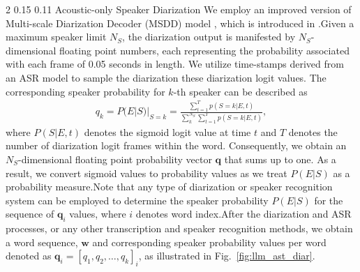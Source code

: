 \documentclass{article}
\makeatletter
\renewcommand{\subsection}{\@startsection
  {subsection}%
  {2}%
  {}%
  {0.15\baselineskip}%
  {0.11\baselineskip}%
  {}}%
\makeatother
\begin{document}
\subsection{Acoustic-only Speaker Diarization}
\label{sec:acoustic_infer}
We employ an improved version of Multi-scale Diarization Decoder (MSDD) model \cite{park2022multi}, which is introduced in \cite{park2023chime}.\;Given a maximum speaker limit $N_S$, the diarization output is manifested by $N_{S}$-dimensional floating point numbers, each representing the probability associated with each frame of 0.05 seconds in length. We utilize time-stamps derived from an ASR model to sample the diarization these diarization logit values. The corresponding speaker probability for $k$-th speaker can be described as 
\begin{align}
q_{k} = P(E|S)|_{S=k} = \frac{\sum_{t=1}^{T} p(S=k|E, t)}{\sum_{k}^{N_{S}}\sum_{t=1}^{T} p(S=k|E, t)},
\label{eq:word_diar_logits}
\end{align}
where $P(S|E, t)$ denotes the sigmoid logit value at time $t$ and $T$ denotes the number of diarization logit frames within the word. Consequently, we obtain an $N_{S}$-dimensional floating point probability vector $\mathbf{q}$ that sums up to one. As a result, we convert sigmoid values to probability values as we treat $P(E|S)$ as a probability measure.\;Note that any type of diarization or speaker recognition system can be employed to determine the speaker probability $P(E|S)$ for the sequence of $\mathbf{q}_i$ values, where $i$ denotes word index.\;After the diarization and ASR processes, or any other transcription and speaker recognition methods, we obtain a word sequence, $\mathbf{w}$ and corresponding speaker probability values per word denoted as $\mathbf{q}_i=[q_{1}, q_{2}, \dots,  q_{k}]_{i}$, as illustrated in Fig.~\ref{fig:llm_ast_diar}.
\end{document}

